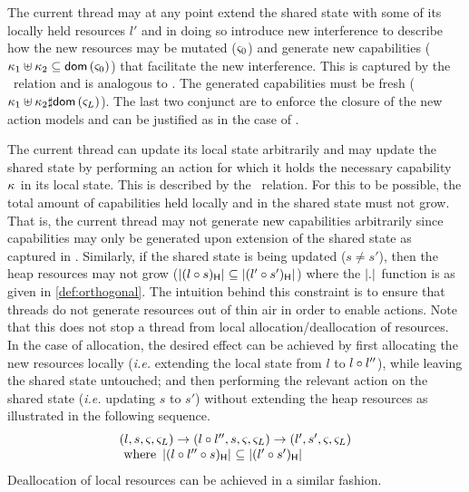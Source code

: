 %
%
The current thread may at any point extend the shared state with some of its locally held resources $l'$ and in doing so introduce new interference to describe how the new resources may be mutated ($\varsigma_{0}$) and generate  new capabilities ($\kappa_{1} \uplus \kappa_{2} \subseteq \textsf{dom}\left( \varsigma_{0} \right)$) that facilitate the new interference. This is captured by the \extendG\ relation and is analogous to \extendR.  The generated capabilities must be fresh ($\kappa_{1} \uplus \kappa_{2}  \sharp \textsf{dom}\left( \varsigma_{L} \right)$). The last two conjunct are to enforce the closure of the new action models and can be justified as in the case of \extendR.

The current thread can update its local state arbitrarily and may update the shared state by performing an action for which it holds the necessary capability $\kappa_{}$ in its local state. This is described by the \updateG\ relation. For this to be possible, the total amount of capabilities held locally and in the shared state must not grow. That is, the current thread may not generate new capabilities arbitrarily since capabilities may only be generated upon extension of the shared state as captured in \extendG. Similarly, if the shared state is being updated ($s \not= s'$),  then the heap resources may not grow ($\left\lvert (l \circ s)_{\textsf{H}}\right\rvert_{} \subseteq \left\lvert (l' \circ s')_{\textsf{H}}\right\rvert_{}$) where the $\left\lvert .\right\rvert_{}$ function is as given in \ref{def:orthogonal}. The intuition behind this constraint is to ensure that threads do not generate resources out of thin air in order to enable actions. Note that this does not stop a thread from local allocation/deallocation of resources. In the case of allocation, the desired effect can be achieved by first allocating the new resources locally (\textit{i.e.} extending the local state from $l$ to $l \circ l''$), while leaving the shared state untouched; and then performing the relevant action on the shared state (\textit{i.e.} updating $s$ to $s'$) without extending the heap resources as illustrated in the following sequence.
%
\[
\begin{array}{l}
	(l, s, \varsigma_{}, \varsigma_{L}) \rightarrow (l \circ l'', s, \varsigma_{}, \varsigma_{L}) \rightarrow (l', s', \varsigma_{}, \varsigma_{L})\\
	\text{ where } \left\lvert (l \circ l'' \circ s)_{\textsf{H}}\right\rvert_{} \subseteq \left\lvert (l' \circ s')_{\textsf{H}}\right\rvert_{}
\end{array}
\]
%
Deallocation of local resources can be achieved in a similar fashion.


